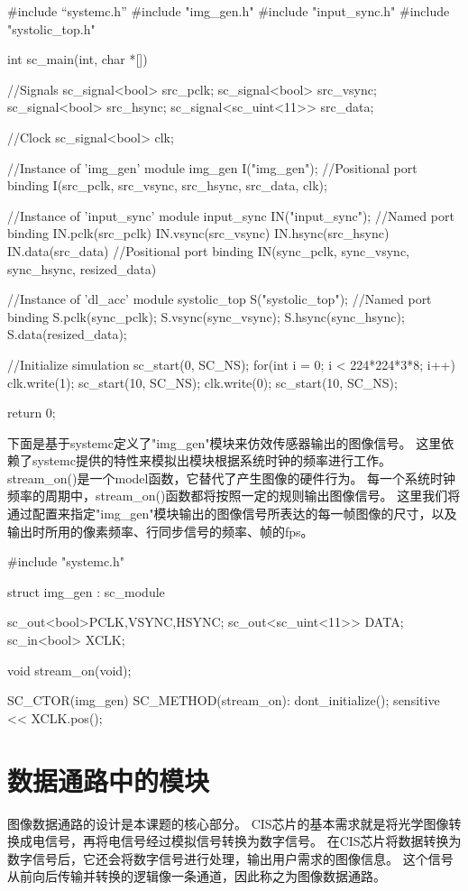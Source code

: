 \begin{codeblock}[language=c++]
#include “systemc.h”
#include "img_gen.h"
#include "input_sync.h"
#include "systolic_top.h"

int sc_main(int, char *[])
{
  //Signals
  sc_signal<bool> src_pclk;
  sc_signal<bool> src_vsync;
  sc_signal<bool> src_hsync;
  sc_signal<sc_uint<11>> src_data;

  //Clock
  sc_signal<bool> clk;

  //Instance of 'img\_{}gen' module
  img_gen I("img_gen");
  //Positional port binding
  I(src_pclk, src_vsync, src_hsync, src_data, clk);

  //Instance of 'input\_{}sync' module
  input_sync IN("input_sync");
  //Named port binding
  IN.pclk(src_pclk)
  IN.vsync(src_vsync)
  IN.hsync(src_hsync)
  IN.data(src_data)
  //Positional port binding
  IN(sync_pclk, sync_vsync, sync_hsync, resized_data)

  //Instance of 'dl\_{}acc' module
  systolic_top S("systolic_top");
  //Named port binding
  S.pclk(sync_pclk);
  S.vsync(sync_vsync);
  S.hsync(sync_hsync);
  S.data(resized_data);

  //Initialize simulation
  sc_start(0, SC_NS);
  for(int i = 0; i < 224*224*3*8; i++){
    clk.write(1);
    sc_start(10, SC_NS);
    clk.write(0);
    sc_start(10, SC_NS);
  }

  return 0;
}

\end{codeblock}

下面是基于systemc定义了"img_gen"模块来仿效传感器输出的图像信号。
这里依赖了systemc提供的特性来模拟出模块根据系统时钟的频率进行工作。
stream_on()是一个model函数，它替代了产生图像的硬件行为。
每一个系统时钟频率的周期中，stream_on()函数都将按照一定的规则输出图像信号。
这里我们将通过配置来指定"img_gen"模块输出的图像信号所表达的每一帧图像的尺寸，以及输出时所用的像素频率、行同步信号的频率、帧的fps。

\begin{codeblock}[language=c++]
#include "systemc.h"

struct img_gen : sc_module{
  sc_out<bool>PCLK,VSYNC,HSYNC;
  sc_out<sc_uint<11>> DATA;
  sc_in<bool> XCLK;

  void stream_on(void);
  
  SC_CTOR(img_gen){
  SC_METHOD(stream_on):
    dont_initialize();
    sensitive << XCLK.pos();
  }
}

\end{codeblock}

\section{数据通路中的模块}
图像数据通路的设计是本课题的核心部分。
CIS芯片的基本需求就是将光学图像转换成电信号，再将电信号经过模拟信号转换为数字信号。
在CIS芯片将数据转换为数字信号后，它还会将数字信号进行处理，输出用户需求的图像信息。
这个信号从前向后传输并转换的逻辑像一条通道，因此称之为图像数据通路。

